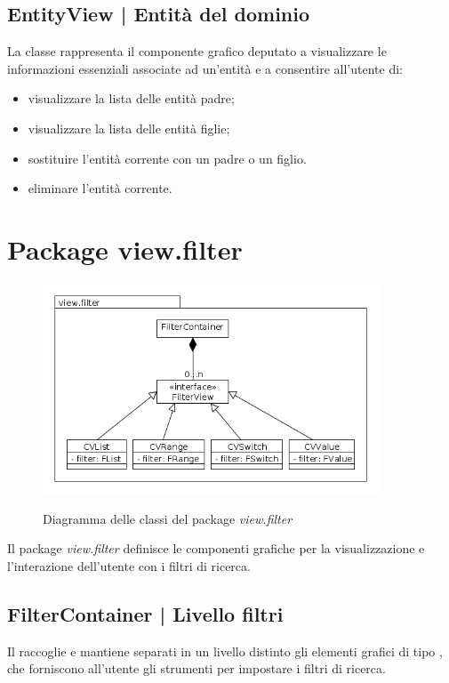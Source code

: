 \documentclass[10pt,a4paper,headinclude,footinclude,hidelinks]{scrreprt} %
\begin{document}
	\subsection[EntityView]{EntityView | Entità del dominio}
	\label{sec:stage:design:view:entity-widget}
	La classe \textit{} rappresenta il componente grafico deputato a visualizzare le informazioni essenziali associate ad un'entità e a consentire all'utente di:
	\begin{itemize}
	\item visualizzare la lista delle entità padre;
	\item visualizzare la lista delle entità figlie;
	\item sostituire l'entità corrente con un padre o un figlio.
	\item eliminare l'entità corrente.
	\end{itemize}

	\section{Package view.filter}
	\label{sec:stage:design:view.filter}

	\begin{figure}[ht]
		\begin{center}
	    	\includegraphics[width=10cm]{class/view_filter.png}
			\label{gfx:class:view:filter}
			\caption{Diagramma delle classi del package \textit{view.filter}}
		\end{center}
	\end{figure}

	Il package \textit{view.filter} definisce le componenti grafiche per la visualizzazione e l'interazione dell'utente con i filtri di ricerca.

	\subsection[FilterContainer]{FilterContainer | Livello filtri}
	\label{sec:stage:design:view.filter:filter-container}
	Il \textit{} raccoglie e mantiene separati in un livello distinto gli elementi grafici di tipo \textit{}, che forniscono all'utente gli strumenti per impostare i filtri di ricerca.
\end{document}
